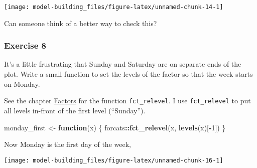 \documentclass[]{book}
\newenvironment{Shaded}{\begin{snugshade}}{\end{snugshade}}
\newcommand{\ControlFlowTok}[1]{\textcolor[rgb]{0.13,0.29,0.53}{\textbf{#1}}}
\newcommand{\DataTypeTok}[1]{\textcolor[rgb]{0.13,0.29,0.53}{#1}}
\newcommand{\DecValTok}[1]{\textcolor[rgb]{0.00,0.00,0.81}{#1}}
\newcommand{\KeywordTok}[1]{\textcolor[rgb]{0.13,0.29,0.53}{\textbf{#1}}}
\newcommand{\NormalTok}[1]{#1}
\newcommand{\OperatorTok}[1]{\textcolor[rgb]{0.81,0.36,0.00}{\textbf{#1}}}
\newcommand{\OtherTok}[1]{\textcolor[rgb]{0.56,0.35,0.01}{#1}}
\newcommand{\StringTok}[1]{\textcolor[rgb]{0.31,0.60,0.02}{#1}}
\theoremstyle{definition}
\theoremstyle{definition}
\theoremstyle{definition}
\theoremstyle{remark}
\begin{document}
\begin{center}\texttt{[image: model-building\_files/figure-latex/unnamed-chunk-14-1]} \end{center}

Can someone think of a better way to check this?

\hypertarget{exercise-8}{%
\subsubsection{Exercise 8}\label{exercise-8}}

It's a little frustrating that Sunday and Saturday are on separate ends
of the plot. Write a small function to set the levels of the factor so
that the week starts on Monday.

See the chapter \href{http://r4ds.had.co.nz/factors.html}{Factors} for
the function \texttt{fct\_relevel}. I use \texttt{fct\_relevel} to put
all levels in-front of the first level (``Sunday'').

\begin{Shaded}
\begin{Highlighting}[]
\NormalTok{monday_first <-}\StringTok{ }\ControlFlowTok{function}\NormalTok{(x) \{}
\NormalTok{  forcats}\OperatorTok{::}\KeywordTok{fct_relevel}\NormalTok{(x, }\KeywordTok{levels}\NormalTok{(x)[}\OperatorTok{-}\DecValTok{1}\NormalTok{])  }
\NormalTok{\}}
\end{Highlighting}
\end{Shaded}

Now Monday is the first day of the week,

\begin{Shaded}
\end{Shaded}

\begin{center}\texttt{[image: model-building\_files/figure-latex/unnamed-chunk-16-1]} \end{center}
\end{document}
